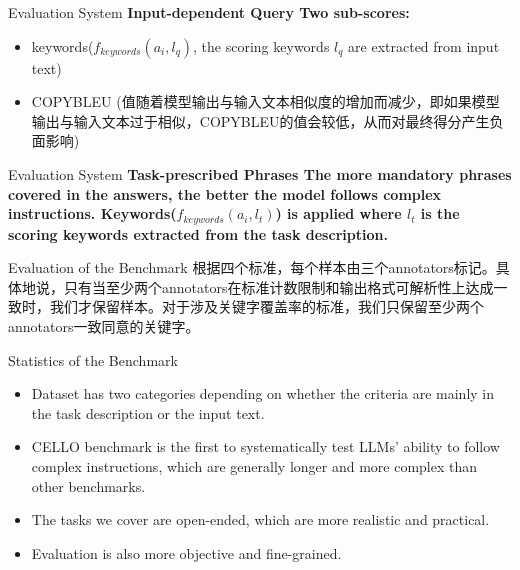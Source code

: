 \documentclass{beamer}
\begin{document}
\begin{frame}{Evaluation System}
    \large\bfseries{Input-dependent Query}
    \newline
    \normalfont
    Two sub-scores:
    \begin{itemize}
        \item {keywords($f_{keywords}(a_i, l_q)$, the scoring keywords $l_q$ are extracted from input text)}
        \item {COPYBLEU (值随着模型输出与输入文本相似度的增加而减少，即如果模型输出与输入文本过于相似，COPYBLEU的值会较低，从而对最终得分产生负面影响)}
    \end{itemize}
\end{frame}

\begin{frame}{Evaluation System}
    \large\bfseries{Task-prescribed Phrases}
    \newline
    \normalfont
    The more mandatory phrases covered in the answers, the better the model follows complex instructions.
    \newline
    \newline
    Keywords($f_{keywords}(a_i, l_t)$) is applied where $l_t$ is the scoring keywords extracted from the task description.
\end{frame}

\begin{frame}{Evaluation of the Benchmark}
    根据四个标准，每个样本由三个annotators标记。具体地说，只有当至少两个annotators在标准计数限制和输出格式可解析性上达成一致时，我们才保留样本。对于涉及关键字覆盖率的标准，我们只保留至少两个annotators一致同意的关键字。
\end{frame}

\begin{frame}{Statistics of the Benchmark}
    \begin{itemize}
        \item {Dataset has two categories depending on whether the criteria are mainly in the task description or the input text.}
        \item {CELLO benchmark is the first to systematically test LLMs' ability to follow complex instructions, which are generally longer and more complex than other benchmarks.}
        \item {The tasks we cover are open-ended, which are more realistic and practical.}
        \item {Evaluation is also more objective and fine-grained.}
    \end{itemize}
    
\end{frame}
\end{document}
